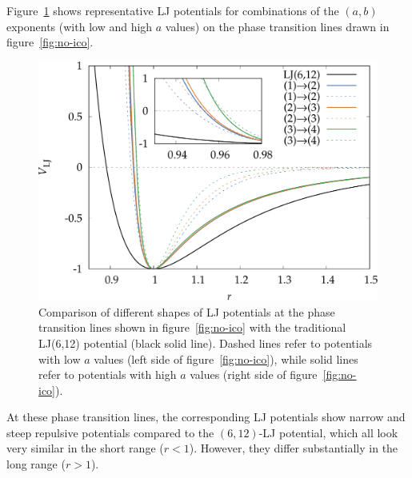 Figure~\ref{fig:compareLJ} shows representative \ac{LJ} potentials for
combinations of the $(a,b)$ exponents (with low and high $a$ values) on the
phase transition lines drawn in figure~\ref{fig:no-ico}. 
%
\begin{figure}[htb]\centering
    \includegraphics[width=.8\columnwidth]{gregory-newton/compareLJ.pdf}
    \caption{Comparison of different shapes of LJ potentials at the phase
    transition lines shown in figure~\ref{fig:no-ico} with the traditional
    LJ(6,12) potential (black solid line). Dashed lines refer to potentials
    with low $a$ values (left side of figure~\ref{fig:no-ico}), while solid lines
    refer to potentials with high $a$ values (right side of
    figure~\ref{fig:no-ico}).}
    \label{fig:compareLJ}
\end{figure}
%
At these phase transition lines, the corresponding \ac{LJ} potentials show
narrow and steep repulsive potentials compared to the $(6,12)$-\ac{LJ}
potential, which all look very similar in the short range ($r<1$). However,
they differ substantially in the long range ($r>1$).

